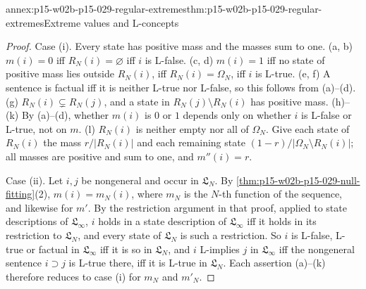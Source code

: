 \begin{annexitem}{annex:p15-w02b-p15-029-regular-extremes}{thm:p15-w02b-p15-029-regular-extremes}{Extreme values and L-concepts}
\begin{proof}
Case (i). Every state has positive mass and the masses sum to one.
(a, b) \(m(i)=0\) iff \(R_N(i)=\varnothing\) iff \(i\) is L-false.
(c, d) \(m(i)=1\) iff no state of positive mass lies outside
\(R_N(i)\), iff \(R_N(i)=\Omega_N\), iff \(i\) is L-true. (e, f) A
sentence is factual iff it is neither L-true nor L-false, so this
follows from (a)--(d). (g) \(R_N(i)\subsetneq R_N(j)\), and a state in
\(R_N(j)\setminus R_N(i)\) has positive mass. (h)--(k) By (a)--(d),
whether \(m(i)\) is \(0\) or \(1\) depends only on whether \(i\) is
L-false or L-true, not on \(m\). (l) \(R_N(i)\) is neither empty nor
all of \(\Omega_N\). Give each state of \(R_N(i)\) the mass
\(r/\lvert R_N(i)\rvert\) and each remaining state
\((1-r)/\lvert\Omega_N\setminus R_N(i)\rvert\); all masses are positive
and sum to one, and \(m''(i)=r\).

Case (ii). Let \(i,j\) be nongeneral and occur in \(\mathfrak L_N\).
By \cref{thm:p15-w02b-p15-029-null-fitting}(2), \(m(i)=m_N(i)\),
where \(m_N\) is the \(N\)-th function of the sequence, and likewise for
\(m'\). By the restriction argument in that proof, applied to state
descriptions of \(\mathfrak L_\infty\), \(i\) holds in a state
description of \(\mathfrak L_\infty\) iff it holds in its restriction to
\(\mathfrak L_N\), and every state of \(\mathfrak L_N\) is such a
restriction. So \(i\) is L-false, L-true or factual in
\(\mathfrak L_\infty\) iff it is so in \(\mathfrak L_N\), and \(i\)
L-implies \(j\) in \(\mathfrak L_\infty\) iff the nongeneral sentence
\(i\supset j\) is L-true there, iff it is L-true in
\(\mathfrak L_N\). Each assertion (a)--(k) therefore reduces to case (i)
for \(m_N\) and \(m'_N\).
\end{proof}
\end{annexitem}

